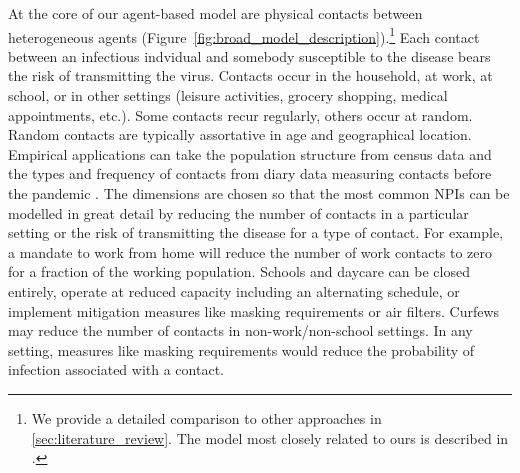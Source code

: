 At the core of our agent-based model are physical contacts between heterogeneous agents (Figure~\ref{fig:broad_model_description}).\footnote{We provide a detailed comparison to other approaches in \ref{sec:literature_review}. The model most closely related to ours is described in \citet{Hinch2020}.} Each contact between an infectious indvidual and somebody susceptible to the disease bears the risk of transmitting the virus. Contacts occur in the household, at work, at school, or in other settings (leisure activities, grocery shopping, medical appointments, etc.). Some contacts recur regularly, others occur at random. Random contacts are typically assortative in age and geographical location. Empirical applications can take the population structure from census data and the types and frequency of contacts from diary data measuring contacts before the pandemic \citep[e.g.][]{Mossong2008}. The dimensions are chosen so that the most common NPIs can be modelled in great detail by reducing the number of contacts in a particular setting or the risk of transmitting the disease for a type of contact. For example, a mandate to work from home will reduce the number of work contacts to zero for a fraction of the working population. Schools and daycare can be closed entirely, operate at reduced capacity including an alternating schedule, or implement mitigation measures like masking requirements or air filters. Curfews may reduce the number of contacts in non-work/non-school settings. In any setting, measures like masking requirements would reduce the probability of infection associated with a contact.

